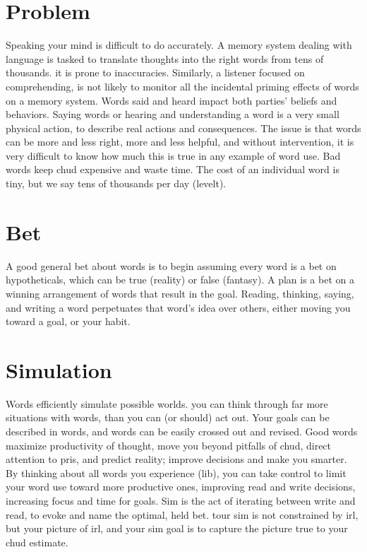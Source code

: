 \documentclass[
]{book}
\begin{document}
\hypertarget{bet-problem}{%
\section{Problem}\label{bet-problem}}

Speaking your mind is difficult to do accurately.
A memory system dealing with language is tasked to translate thoughts into the right words from tens of thousands. it is prone to inaccuracies.
Similarly, a listener focused on comprehending, is not likely to monitor all the incidental priming effects of words on a memory system.
Words said and heard impact both parties' beliefs and behaviors.
Saying words or hearing and understanding a word is a very small physical action, to describe real actions and consequences.
The issue is that words can be more and less right, more and less helpful, and without intervention, it is very difficult to know how much this is true in any example of word use.
Bad words keep chud expensive and waste time.
The cost of an individual word is tiny, but we say tens of thousands per day (levelt).

\hypertarget{word-bet}{%
\section{Bet}\label{word-bet}}

A good general bet about words is to begin assuming every word is a bet on hypotheticals, which can be true (reality) or false (fantasy).
A plan is a bet on a winning arrangement of words that result in the goal.
Reading, thinking, saying, and writing a word perpetuates that word's idea over others, either moving you toward a goal, or your habit.

\hypertarget{simulation}{%
\section{Simulation}\label{simulation}}

Words efficiently simulate possible worlds. you can think through far more situations with words, than you can (or should) act out.
Your goals can be described in words, and words can be easily crossed out and revised.
Good words maximize productivity of thought, move you beyond pitfalls of chud, direct attention to pris, and predict reality; improve decisions and make you smarter.
By thinking about all words you experience (lib), you can take control to limit your word use toward more productive ones, improving read and write decisions, increasing focus and time for goals.
Sim is the act of iterating between write and read, to evoke and name the optimal, held bet. tour sim is not constrained by irl, but your picture of irl, and your sim goal is to capture the picture true to your chud estimate.
\end{document}
